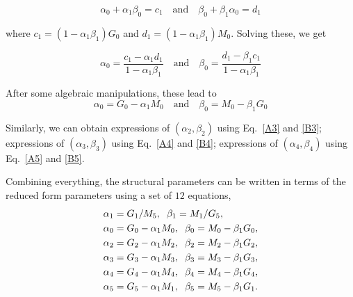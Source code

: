 \documentclass[11pt, a4paper]{article}
\begin{document}
$$
\alpha_{0}+\alpha_{1}\beta_{0}=c_{1} \quad \text{and} \quad  \beta_{0}+\beta_{1}\alpha_{0}=d_{1}
$$

\noindent where $c_{1}=(1-\alpha_{1}\beta_{1})G_{0}$ and $d_{1}=(1-\alpha_{1}\beta_{1})M_{0}$. Solving these, we get

$$\alpha_{0}=\dfrac{c_{1}-\alpha_{1}d_{1}}{1-\alpha_{1}\beta_{1}} \quad \text{and} \quad \beta_{0}=\dfrac{d_{1}-\beta_{1}c_{1}}{1-\alpha_{1}\beta_{1}}$$

\noindent After some algebraic manipulations, these lead to
$$\alpha_{0}=G_{0}-\alpha_{1}M_{0} \quad \text{and} \quad  \beta_{0}=M_{0}-\beta_{1}G_{0}$$

\noindent Similarly, we can obtain expressions of $(\alpha_{2},\beta_{2})$ using Eq.~\eqref{A3} and \eqref{B3}; expressions of $(\alpha_{3},\beta_{3})$ using Eq.~\eqref{A4} and \eqref{B4}; expressions of $(\alpha_{4},\beta_{4})$ using Eq.~\eqref{A5} and \eqref{B5}.

Combining everything, the structural parameters can be written in terms of the reduced form parameters using a set of $12$ equations,
%
\begin{equation}
    \begin{split}
    & \alpha_{1}=G_{1}/M_{5}, \hspace{2mm} \beta_{1}=M_{1}/G_{5}, \\
    & \alpha_{0}=G_{0}-\alpha_{1}M_{0}, \hspace{2mm}  \beta_{0}=M_{0}-\beta_{1}G_{0},\\
    & \alpha_{2}=G_{2}-\alpha_{1}M_{2}, \hspace{2mm}  \beta_{2}=M_{2}-\beta_{1}G_{2},\\
    & \alpha_{3}=G_{3}-\alpha_{1}M_{3}, \hspace{2mm}  \beta_{3}=M_{3}-\beta_{1}G_{3},\\
    & \alpha_{4}=G_{4}-\alpha_{1}M_{4}, \hspace{2mm}  \beta_{4}=M_{4}-\beta_{1}G_{4},\\
    & \alpha_{5}=G_{5}-\alpha_{1}M_{1}, \hspace{2mm}  \beta_{5}=M_{5}-\beta_{1}G_{1}.
    \end{split}
    \label{eqn:expressions}
\end{equation}
\end{document}
